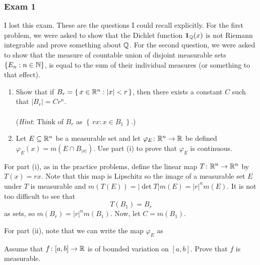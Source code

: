 \subsubsection{Exam 1}
\setcounter{exercise}{0}
\setcounter{equation}{0}

I lost this exam. These are the questions I could recall explicitly. For
the first problem, we were asked to show that the Dichlet function
\(\operatorname{\mathbf{1}}_{\mathbb{Q}}(x)\) is not Riemann integrable and prove something about
\(\mathbb{Q}\). For the second question, we were asked to show that the measure
of countable union of disjoint measurable sets \(\{E_n:n\in\mathbb{N}\}\), is
equal to the sum of their individual measures (or something to that
effect).
\begin{problem}
\end{problem}

\begin{problem}
\end{problem}

\begin{problem}
\hfill
\begin{enumerate}[label=(\roman*),noitemsep]
\item Show that if \(B_r=\left\{\,x\in\mathbb{R}^n:|x|<r\,\right\}\), then there
  exists a constant \(C\) such that \(|B_r|=Cr^n\).
  \\\\
  (\emph{Hint}: Think of \(B_r\) as \(\left\{\,rx:x\in B_1\,\right\}\).)
\item Let \(E\subseteq\mathbb{R}^n\) be a measurable set and let
  \(\varphi_E\colon\mathbb{R}^n\to\mathbb{R}\) be defined
  \(\varphi_E(x)=m(E\cap B_{|x|})\). Use part (i) to prove that
  \(\varphi_E\) is continuous.
\end{enumerate}
\end{problem}
\begin{solution}
  For part (i), as in the practice problems, define the linear map
  \(T\colon\mathbb{R}^n\to\mathbb{R}^n\) by \(T(x)=rx\). Note that this map is
  Lipschitz so the image of a measurable set \(E\) under \(T\) is
  measurable and \(m(T(E))=|{\det T}|m(E)=|r|^nm(E)\). It is not too
  difficult to see that
  \[
    T(B_1)=B_r
  \]
  as sets, so \(m(B_r)=|r|^nm(B_1)\). Now, let \(C=m(B_1)\).

  For part (ii), note that we can write the map \(\varphi_E\) as
\end{solution}

\begin{problem}
  Assume that \(f\colon[a,b]\to\mathbb{R}\) is of bounded variation on
  \([a,b]\). Prove that \(f\) is measurable.
\end{problem}
\begin{solution}
\end{solution}

